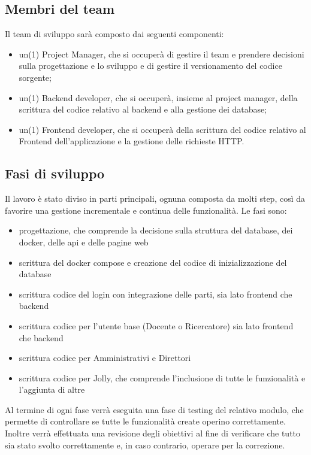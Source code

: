\documentclass{article}
\begin{document}
\subsection{Membri del team}
Il team di sviluppo sarà composto dai seguenti componenti: 
\begin{itemize}
    \item un(1) Project Manager, che si occuperà  di gestire il team e prendere decisioni sulla progettazione e lo sviluppo e di gestire il versionamento del codice sorgente;
    \item un(1) Backend developer, che si occuperà, insieme al project manager, della scrittura del codice relativo al backend e alla gestione dei database;
    \item un(1) Frontend developer, che si occuperà della scrittura del codice relativo al Frontend dell'applicazione e la gestione delle richieste HTTP.
\end{itemize}

\subsection{Fasi di sviluppo}
Il lavoro è stato diviso in  parti principali, ognuna composta da molti step, così da favorire una gestione incrementale e continua delle funzionalità. Le fasi sono:

\begin{itemize}
    \item progettazione, che comprende la decisione sulla struttura del database, dei docker, delle api e delle pagine web
    \item scrittura del docker compose e creazione del codice di inizializzazione del database
    \item scrittura codice del login con integrazione delle parti, sia lato frontend che backend
    \item scrittura codice per l'utente base (Docente o Ricercatore) sia lato frontend che backend
    \item scrittura codice per Amministrativi e Direttori
    \item scrittura codice per Jolly, che comprende l'inclusione di tutte le funzionalità e l'aggiunta di altre
\end{itemize}

Al termine di ogni fase verrà eseguita una fase di testing del relativo modulo, che permette di controllare se tutte le funzionalità create operino correttamente. Inoltre verrà effettuata una revisione degli obiettivi al fine di verificare che tutto sia stato svolto correttamente e, in caso contrario, operare per la correzione.
\end{document}
